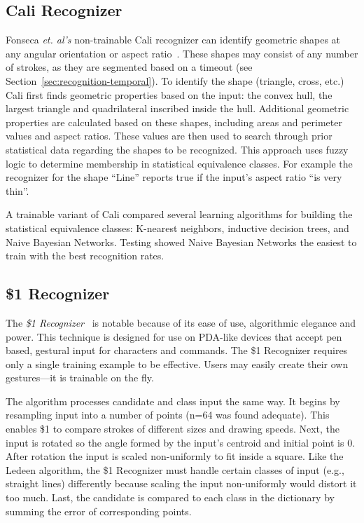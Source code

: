 \subsection{Cali Recognizer}

Fonseca \textit{et. al's} non-trainable Cali recognizer can identify
geometric shapes at any angular orientation or aspect
ratio~\cite{fonseca-caligraphic,fonseca-fuzzy-recognition}. These
shapes may consist of any number of strokes, as they are segmented
based on a timeout (see Section~\ref{sec:recognition-temporal}). To
identify the shape (triangle, cross, etc.) Cali first finds geometric
properties based on the input: the convex hull, the largest triangle
and quadrilateral inscribed inside the hull.  Additional geometric
properties are calculated based on these shapes, including areas and
perimeter values and aspect ratios. These values are then used to
search through prior statistical data regarding the shapes to be
recognized. This approach uses fuzzy logic to determine membership in
statistical equivalence classes. For example the recognizer for the
shape ``Line'' reports true if the input's aspect ratio ``is very
thin''.

A trainable variant of Cali compared several learning algorithms for
building the statistical equivalence classes: K-nearest neighbors,
inductive decision trees, and Naive Bayesian Networks. Testing showed
Naive Bayesian Networks the easiest to train with the best recognition
rates.

\subsection{\$1 Recognizer}

The \textit{\$1 Recognizer}~\cite{wobbrock-dollar} is notable because
of its ease of use, algorithmic elegance and power. This technique is
designed for use on PDA-like devices that accept pen based, gestural
input for characters and commands. The \$1 Recognizer requires only a
single training example to be effective. Users may easily create their
own gestures---it is trainable on the fly.

The algorithm processes candidate and class input the same way. It
begins by resampling input into a number of points (n=64 was found
adequate). This enables \$1 to compare strokes of different sizes and
drawing speeds. Next, the input is rotated so the angle formed by the
input's centroid and initial point is 0\degree. After rotation the
input is scaled non-uniformly to fit inside a square. Like the Ledeen
algorithm, the \$1 Recognizer must handle certain classes of input
(e.g., straight lines) differently because scaling the input
non-uniformly would distort it too much. Last, the candidate is
compared to each class in the dictionary by summing the error of
corresponding points.

